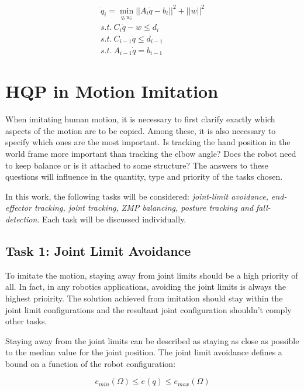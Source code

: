 \begin{align}
    \label{eq: HQP-final}
    \dot{q}_i = \min_{\dot{q},w_i} ||A_i\dot{q} - b_i||^2 + ||w||^2 \\
    \mathit{s.t.} \ C_i\dot{q} - w \le d_i \\
    \mathit{s.t.} \ C_{i - 1}\dot{q} \leq d_{i-1} \\
    \mathit{s.t.} \ A_{i - 1}\dot{q} = b_{i - 1}
\end{align}

\section{HQP in Motion Imitation}
\label{sec: HQP-imitation}

When imitating human motion, it is necessary to first clarify exactly which aspects of the motion are to be copied. Among these, it is also necessary to specify which ones 
are the most important. Is tracking the hand position in the world frame more important than tracking the elbow angle? Does the robot need to keep balance or is it attached 
to some structure? The answers to these questions will influence in the quantity, type and priority of the tasks chosen.

In this work, the following tasks will be considered: \textit{joint-limit avoidance, end-effector tracking, joint tracking, ZMP balancing, posture tracking and fall-detection}.
Each task will be discussed individually.

\subsection[Joint Limit Avoidance]{Task 1: Joint Limit Avoidance}
To imitate the motion, staying away from joint limits should be a high priority of all. In fact, in any robotics applications, avoiding the joint limits
is always the highest prioirity. The solution achieved from imitation should stay within the joint limit configurations and the resultant joint configuration 
shouldn't comply other tasks. 

Staying away from the joint limits can be described as staying as close as possible to the median value for the joint position.
The joint limit avoidance defines a bound on a function of the robot configuration:

\begin{equation}
    \label{eq: joint-limit-1}
    e_{min}(\Omega) \le e(q) \le e_{max}(\Omega)
\end{equation}

